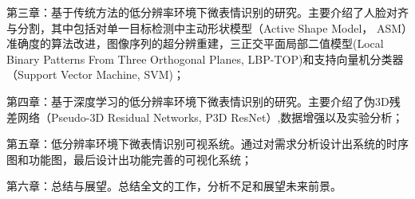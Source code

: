 第三章：基于传统方法的低分辨率环境下微表情识别的研究。主要介绍了人脸对齐与分割，其中包括对单一目标检测中主动形状模型（Active Shape Model， ASM）准确度的算法改进，图像序列的超分辨重建，三正交平面局部二值模型(Local Binary Patterns From Three Orthogonal Planes, LBP-TOP)和支持向量机分类器（Support Vector Machine, SVM)；

第四章：基于深度学习的低分辨率环境下微表情识别的研究。主要介绍了伪3D残差网络（Pseudo-3D Residual Networks, P3D ResNet）,数据增强以及实验分析；

第五章：低分辨率环境下微表情识别可视系统。通过对需求分析设计出系统的时序图和功能图，最后设计出功能完善的可视化系统；

第六章：总结与展望。总结全文的工作，分析不足和展望未来前景。
